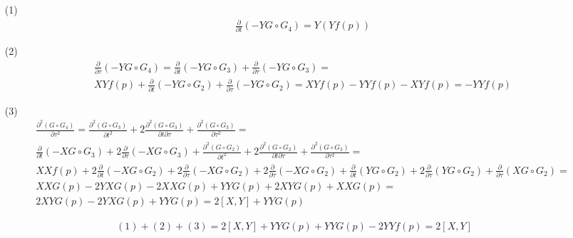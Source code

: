 	\begin{enumerate}
	\item[(1)] \begin{gather*}
		\frac{\partial }{\partial t}(-Y G\circ G_{4}) = Y(Y f(p))
		\end{gather*}
	\item[(2)] \begin{gather*}
		\frac{\partial }{\partial {\tau}}(-Y G\circ G_{4}) = \frac{\partial }{\partial t}(-YG\circ G_{3}) + \frac{\partial }{\partial {\tau}}(-Y G\circ G_{3}) =\\
		XY f(p) + \frac{\partial }{\partial t}(-Y G\circ G_{2}) + \frac{\partial }{\partial {\tau}}(-Y G\circ G_{2}) =
		XY f(p) - YY f(p) - XY f(p) = 
		-YY f(p)
		\end{gather*}
	\item[(3)] \begin{gather*}
		\frac{\partial^2 (G\circ G_{4})}{\partial {\tau}^2} =
		\frac{\partial^2 (G\circ G_{3})}{\partial t^2} + 2\frac{\partial^2 (G\circ G_{3})}{\partial t \partial {\tau}} + \frac{\partial^2 (G\circ G_{3})}{\partial {\tau}^2} =\\
		\frac{\partial }{\partial t}(-X G\circ G_{3}) + 2\frac{\partial }{\partial {\tau}}(-X G\circ G_{3}) + \frac{\partial^2 (G\circ G_{2})}{\partial t^2} + 2\frac{\partial^2 (G\circ G_{2})}{\partial t \partial {\tau}} + \frac{\partial^2 (G\circ G_{3})}{\partial {\tau}^2} =\\
		XXf(p) + 2 \frac{\partial }{\partial t}(-X G\circ G_{2}) + 2\frac{\partial }{\partial {\tau}}(-X G\circ G_{2}) + 2\frac{\partial }{\partial {\tau}}(-X G\circ G_{2}) + \frac{\partial }{\partial t}(Y G\circ G_{2}) + 2\frac{\partial }{\partial {\tau}}(Y G\circ G_{2}) + \frac{\partial }{\partial {\tau}}(X G\circ G_{2}) =\\
		XXG(p) - 2YX G(p) - 2XXG(p) + YYG(p) + 2XYG(p) + XXG(p) =\\
		2XYG(p) - 2YXG(p) + YYG(p) =
		2[X,Y] + YYG(p)
		\end{gather*}
	\end{enumerate}
	\begin{gather*}
		(1) + (2) + (3) = 2[X,Y] + YYG(p) + YYG(p) - 2YYf(p) = 2[X,Y]
	\end{gather*}
\vskip0.5in


